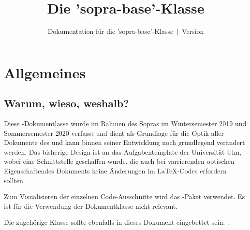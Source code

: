 \documentclass{sopra-base}
\title{Die 'sopra-base'-Klasse}
\subtitle[Dokumentation für die 'sopra-base'-Klasse]{Dokumentation für die 'sopra-base'-Klasse~$\mid$~Version \thesobversion}
\begin{document}
    \maketitle%
%
%

%
%
%
%

\section{Allgemeines}
\subsection{Warum, wieso, weshalb?}
    Diese \LaTeXe-Dokumentlasse wurde im Rahmen des Sopras im 
    Wintersemester 2019 und Sommersemester 2020 verfasst und dient als
    Grundlage für die Optik aller Dokumente des  und kann
    binnen seiner Entwicklung noch grundlegend verändert werden. Das
    bisherige Design ist an das Aufgabentemplate der Universität Ulm, wobei
    eine Schnittstelle geschaffen wurde, die auch bei varrierenden optischen
    Eigenschaftendes Dokuments keine Änderungen im \LaTeX-Codes erfordern 
    sollten.\par
    Zum Visualisieren der einzelnen Code-Ausschnitte wird das
    -Paket verwendet. Es ist für die Verwendung der Dokumentklasse
    nicht relevant.\par
    Die zugehörige Klasse sollte ebenfalls in dieses Dokument eingebettet sein: .
\end{document}
